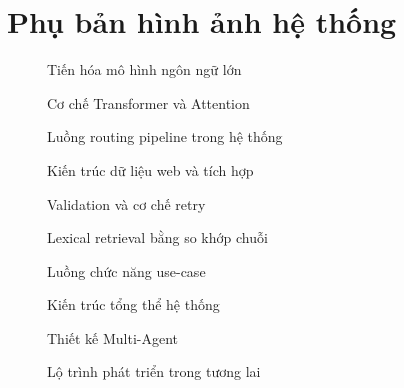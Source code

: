 \documentclass[12pt,a4paper]{report}
\begin{document}
\chapter*{Phụ bản hình ảnh hệ thống}

\begin{figure}[H]
  \centering
  
  \caption{Tiến hóa mô hình ngôn ngữ lớn}
\end{figure}

\begin{figure}[H]
  \centering
  
  \caption{Cơ chế Transformer và Attention}
\end{figure}

\begin{figure}[H]
  \centering
  
  \caption{Luồng routing pipeline trong hệ thống}
\end{figure}

\begin{figure}[H]
  \centering
  
  \caption{Kiến trúc dữ liệu web và tích hợp}
\end{figure}

\begin{figure}[H]
  \centering
  
  \caption{Validation và cơ chế retry}
\end{figure}

\begin{figure}[H]
  \centering
  
  \caption{Lexical retrieval bằng so khớp chuỗi}
\end{figure}

\begin{figure}[H]
  \centering
  
  \caption{Luồng chức năng use-case}
\end{figure}

\begin{figure}[H]
  \centering
  
  \caption{Kiến trúc tổng thể hệ thống}
\end{figure}

\begin{figure}[H]
  \centering
  
  \caption{Thiết kế Multi-Agent}
\end{figure}

\begin{figure}[H]
  \centering
  
  \caption{Lộ trình phát triển trong tương lai}
\end{figure}
\end{document}
